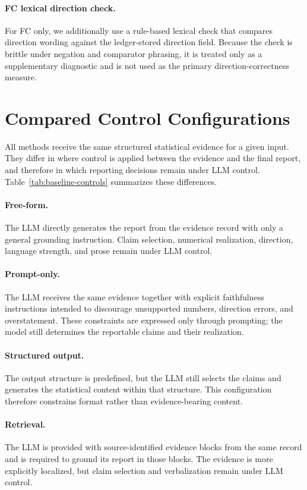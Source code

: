\documentclass[10pt,twocolumn]{article}
\begin{document}
\paragraph{FC lexical direction check.} For FC only, we additionally use a rule-based lexical check that compares direction wording against the ledger-stored direction field. Because the check is brittle under negation and comparator phrasing, it is treated only as a supplementary diagnostic and is not used as the primary direction-correctness measure.

\section{Compared Control Configurations}
\label{app:baselines}

All methods receive the same structured statistical evidence for a given input. They differ in where control is applied between the evidence and the final report, and therefore in which reporting decisions remain under LLM control. Table~\ref{tab:baseline-controls} summarizes these differences.

\paragraph{Free-form.} The LLM directly generates the report from the evidence record with only a general grounding instruction. Claim selection, numerical realization, direction, language strength, and prose remain under LLM control.

\paragraph{Prompt-only.} The LLM receives the same evidence together with explicit faithfulness instructions intended to discourage unsupported numbers, direction errors, and overstatement. These constraints are expressed only through prompting; the model still determines the reportable claims and their realization.

\paragraph{Structured output.} The output structure is predefined, but the LLM still selects the claims and generates the statistical content within that structure. This configuration therefore constrains format rather than evidence-bearing content.

\paragraph{Retrieval.} The LLM is provided with source-identified evidence blocks from the same record and is required to ground its report in those blocks. The evidence is more explicitly localized, but claim selection and verbalization remain under LLM control.
\end{document}
